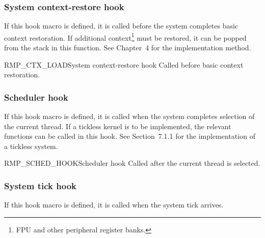 \subsubsection{System context-restore hook}

If this hook macro is defined, it is called before the system completes basic context restoration.
If additional context\footnote{FPU and other peripheral register banks.} must be restored, it can be popped from the stack in this function.
See Chapter~4 for the implementation method.

\begin{apidesc}{RMP\_CTX\_LOAD}{System context-restore hook}\label{api:RMP_CTX_LOAD}
    Called before basic context restoration.
    \begin{apiparams}
    \end{apiparams}
    \begin{apiret}
    \end{apiret}
\end{apidesc}

\subsubsection{Scheduler hook}

If this hook macro is defined, it is called when the system completes selection of the current thread.
If a tickless kernel is to be implemented, the relevant functions can be called in this hook.
See Section~7.1.1 for the implementation of a tickless system.

\begin{apidesc}{RMP\_SCHED\_HOOK}{Scheduler hook}\label{api:RMP_SCHED_HOOK}
    Called after the current thread is selected.
    \begin{apiparams}
    \end{apiparams}
    \begin{apiret}
    \end{apiret}
\end{apidesc}

\subsubsection{System tick hook}

If this hook macro is defined, it is called when the system tick arrives.

